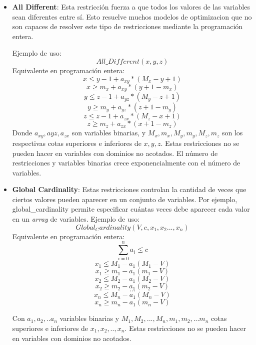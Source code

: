 \documentclass[12pt]{report}
\begin{document}
\begin{itemize}
    \item \textbf{All Different}: Esta restricción fuerza a que todos los valores de las variables sean diferentes entre sí. Esto resuelve muchos modelos de optimizacion que no son capaces de resolver este tipo de restricciones mediante la programación entera.
    
    Ejemplo de uso:
    $$All\_Different(x,y,z)$$
    Equivalente en programación entera:
    $$x\leq y-1+a_{xy}*(M_x-y+1)$$
    $$x\geq m_x+a_{xy}*(y+1-m_x)$$
    $$y\leq z-1+a_{yz}*(M_y-z+1)$$
    $$y\geq m_y+a_{yz}*(z+1-m_y)$$
    $$z\leq z-1+a_{zx}*(M_z-x+1)$$
    $$z\geq m_z+a_{zx}*(x+1-m_z)$$
    Donde $a_{xy},a{yz},a_{zx}$ son variables binarias, y $M_x,m_x,M_y,m_y,M_z,m_z$ son los respectivas cotas superiores e inferiores de $x,y,z$. Estas restricciones no se pueden hacer en variables con dominios no acotados. El número de restricciones y variables binarias crece exponencialmente con el número de variables.
    
    \item \textbf{Global Cardinality}: Estas restricciones controlan la cantidad de veces que ciertos valores pueden aparecer en un conjunto de variables. Por ejemplo, global\_cardinality permite especificar cuántas veces debe aparecer cada valor en un \textit{array} de variables.
    Ejemplo de uso:
    $$Global_Cardinality(V,c,x_1,x_2...,x_n)$$
    Equivalente en programación entera:
    $$\sum^n_{i=0} a_i \leq c$$
    $$x_1\leq M_1 - a_1(M_1-V)$$
    $$x_1\geq m_1 - a_1(m_1-V)$$
    $$x_2\leq M_2 - a_1(M_2-V)$$
    $$x_2\geq m_2 - a_1(m_2-V)$$
    $$...$$    
    $$x_n\leq M_n - a_1(M_n-V)$$
    $$x_n\geq m_n - a_1(m_n-V)$$

    Con $a_1,a_2,..a_n$ variables binarias y $M_1,M_2,...,M_n,m_1,m_2,...m_n$ cotas superiores e inferiores de $x_1,x_2,..,x_n$. Estas restricciones no se pueden hacer en variables con dominios no acotados.
    

\end{itemize}
\end{document}
